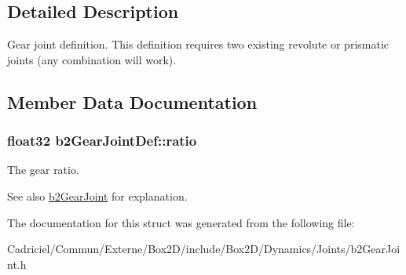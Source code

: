 \subsection{Detailed Description}
Gear joint definition. This definition requires two existing revolute or prismatic joints (any combination will work). 

\subsection{Member Data Documentation}
\subsubsection[{\texorpdfstring{ratio}{ratio}}]{\setlength{\rightskip}{0pt plus 5cm}float32 b2\+Gear\+Joint\+Def\+::ratio}\hypertarget{structb2_gear_joint_def_a57e9f4b6ce1ddc8b89b8455515f69323}{}\label{structb2_gear_joint_def_a57e9f4b6ce1ddc8b89b8455515f69323}
The gear ratio. \begin{DoxySeeAlso}{See also}
\hyperlink{classb2_gear_joint}{b2\+Gear\+Joint} for explanation. 
\end{DoxySeeAlso}


The documentation for this struct was generated from the following file\+:\begin{DoxyCompactItemize}
\item 
Cadriciel/\+Commun/\+Externe/\+Box2\+D/include/\+Box2\+D/\+Dynamics/\+Joints/b2\+Gear\+Joint.\+h\end{DoxyCompactItemize}
